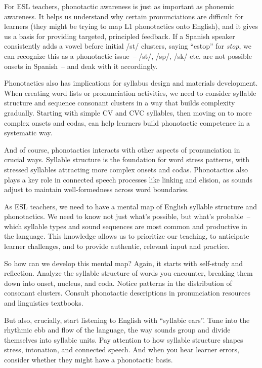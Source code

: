 For ESL teachers, phonotactic awareness is just as important as phonemic awareness. It helps us understand why certain pronunciations are difficult for learners (they might be trying to map L1 phonotactics onto English), and it gives us a basis for providing targeted, principled feedback. If a Spanish speaker consistently adds a vowel before initial /st/ clusters, saying ``estop'' for \textit{stop}, we can recognize this as a phonotactic issue~-- /st/, /sp/, /sk/ etc. are not possible onsets in Spanish~-- and deak with it accordingly.

Phonotactics also has implications for syllabus design and materials development. When creating word lists or pronunciation activities, we need to consider syllable structure and sequence consonant clusters in a way that builds complexity gradually. Starting with simple CV and CVC syllables, then moving on to more complex onsets and codas, can help learners build phonotactic competence in a systematic way.

And of course, phonotactics interacts with other aspects of pronunciation in crucial ways. Syllable structure is the foundation for word stress patterns, with stressed syllables attracting more complex onsets and codas. Phonotactics also plays a key role in connected speech processes like linking and elision, as sounds adjust to maintain well-formedness across word boundaries.

As ESL teachers, we need to have a mental map of English syllable structure and phonotactics. We need to know not just what's possible, but what's probable~-- which syllable types and sound sequences are most common and productive in the language. This knowledge allows us to prioritize our teaching, to anticipate learner challenges, and to provide authentic, relevant input and practice.

So how can we develop this mental map? Again, it starts with self-study and reflection. Analyze the syllable structure of words you encounter, breaking them down into onset, nucleus, and coda. Notice patterns in the distribution of consonant clusters. Consult phonotactic descriptions in pronunciation resources and linguistics textbooks.

But also, crucially, start listening to English with ``syllabic ears''. Tune into the rhythmic ebb and flow of the language, the way sounds group and divide themselves into syllabic units. Pay attention to how syllable structure shapes stress, intonation, and connected speech. And when you hear learner errors, consider whether they might have a phonotactic basis.

